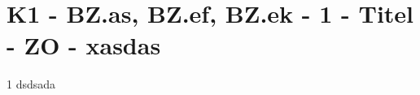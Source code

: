 \section{K1 - BZ.as, BZ.ef, BZ.ek - 1 - Titel - ZO - xasdas}

\begin{langesbeispiel}\item[1] %
dsdsada

\end{langesbeispiel}